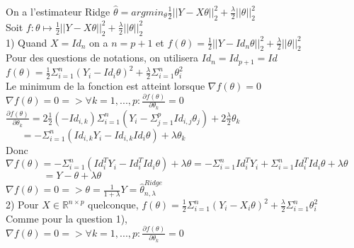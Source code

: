 \documentclass[11pt,a4paper,fleqn]{article}
\begin{document}
On a l'estimateur Ridge $\widehat{\theta}=argmin_\theta \frac{1}{2}||Y-X\theta||_2^2+\frac{\lambda}{2}||\theta||_2^2$ \\

Soit $f: \theta \mapsto \frac{1}{2}||Y-X\theta||_2^2+\frac{\lambda}{2}||\theta||_2^2$ \\

1) Quand $X=Id_n$ on a $n=p+1$ et $f(\theta)=\frac{1}{2}||Y-Id_n\theta||_2^2+\frac{\lambda}{2}||\theta||_2^2$ \\

Pour des questions de notations, on utilisera $Id_n=Id_{p+1}=Id$ \\

$f(\theta)=\frac{1}{2}\Sigma_{i=1}^n(Y_i-Id_i\theta)^2+\frac{\lambda}{2} \Sigma_{i=1}^n \theta_i^2$ \\

Le minimum de la fonction est atteint lorsque $\nabla f(\theta) = 0$ \\

$\nabla f(\theta) = 0 => \forall k=1,...,p: \frac{\partial f(\theta)}{\partial \theta_k}=0$ \\

$\frac{\partial f(\theta)}{\partial \theta_k}=2\frac{1}{2} (-Id_{i,k}) \Sigma_{i=1}^n (Y_i-\Sigma_{j=1}^pId_{i,j}\theta_j)+2\frac{\lambda}{2} \theta_k$ \\

$~~~~~~~=-\Sigma_{i=1}^n(Id_{i,k}Y_i-Id_{i,k}Id_i\theta)+\lambda \theta_k$ \\

Donc $\nabla f(\theta)=-\Sigma_{i=1}^n(Id_i^TY_i-Id_i^TId_i\theta)+\lambda \theta=-\Sigma_{i=1}^nId_i^TY_i+\Sigma_{i=1}^nId_i^TId_i \theta +\lambda \theta$ \\

$~~~~~~~~~~~~~~~~~=Y-\theta+\lambda \theta$ \\

$\nabla f(\theta) = 0 => \theta = \frac{1}{1+\lambda}Y= \hat{\theta}_{n,\lambda}^{Ridge} $\\


2) Pour $X \in \mathbb{R}^{n \times p}$ quelconque, $f(\theta)=\frac{1}{2}\Sigma_{i=1}^n(Y_i-X_i\theta)^2+\frac{\lambda}{2} \Sigma_{i=1}^n \theta_i^2$ \\

Comme pour la question 1), \\
$\nabla f(\theta) = 0 => \forall k=1,...,p: \frac{\partial f(\theta)}{\partial \theta_k}=0$ \\
\end{document}
